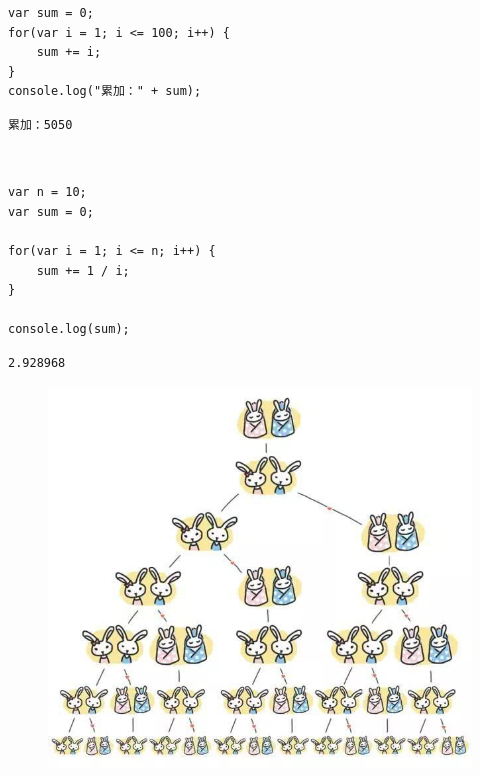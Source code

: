 \begin{lstlisting}[style=htmlcssjs]
var sum = 0;
for(var i = 1; i <= 100; i++) {
    sum += i;
}
console.log("累加：" + sum);
\end{lstlisting}

\begin{tcolorbox}
	\begin{verbatim}
累加：5050
	\end{verbatim}
\end{tcolorbox}

\vspace{0.5cm}

\\

\begin{lstlisting}[style=htmlcssjs]
var n = 10;
var sum = 0;

for(var i = 1; i <= n; i++) {
    sum += 1 / i;
}

console.log(sum);
\end{lstlisting}

\begin{tcolorbox}
	\begin{verbatim}
2.928968
	\end{verbatim}
\end{tcolorbox}

\vspace{0.5cm}


\begin{figure}[H]
	\centering
	\includegraphics[scale=0.5]{img/C11/11-4/1.png}
\end{figure}


